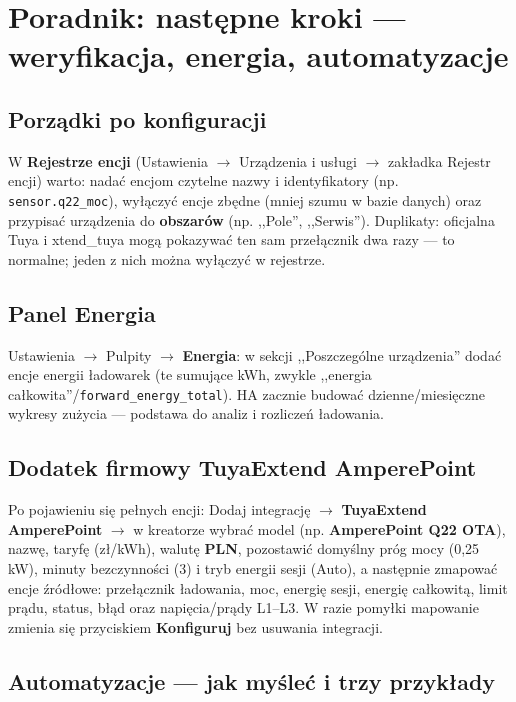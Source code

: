 \documentclass[11pt,a4paper]{article}
\begin{document}
\section{Poradnik: następne kroki --- weryfikacja, energia, automatyzacje}
\label{sec:poradnik}

\subsection{Porządki po konfiguracji}

W \textbf{Rejestrze encji} (Ustawienia $\to$ Urządzenia i usługi $\to$ zakładka Rejestr encji) warto: nadać encjom czytelne nazwy i identyfikatory (np. \texttt{sensor.q22\_moc}), wyłączyć encje zbędne (mniej szumu w bazie danych) oraz przypisać urządzenia do \textbf{obszarów} (np. ,,Pole'', ,,Serwis''). Duplikaty: oficjalna Tuya i xtend\_tuya mogą pokazywać ten sam przełącznik dwa razy --- to normalne; jeden z nich można wyłączyć w rejestrze.

\subsection{Panel Energia}

Ustawienia $\to$ Pulpity $\to$ \textbf{Energia}: w sekcji ,,Poszczególne urządzenia'' dodać encje energii ładowarek (te sumujące kWh, zwykle ,,energia całkowita''/\texttt{forward\_energy\_total}). HA zacznie budować dzienne/miesięczne wykresy zużycia --- podstawa do analiz i rozliczeń ładowania.

\subsection{Dodatek firmowy TuyaExtend AmperePoint}

Po pojawieniu się pełnych encji: Dodaj integrację $\to$ \textbf{TuyaExtend AmperePoint} $\to$ w kreatorze wybrać model (np. \textbf{AmperePoint Q22 OTA}), nazwę, taryfę (zł/kWh), walutę \textbf{PLN}, pozostawić domyślny próg mocy (0{,}25 kW), minuty bezczynności (3) i tryb energii sesji (Auto), a następnie zmapować encje źródłowe: przełącznik ładowania, moc, energię sesji, energię całkowitą, limit prądu, status, błąd oraz napięcia/prądy L1--L3. W razie pomyłki mapowanie zmienia się przyciskiem \textbf{Konfiguruj} bez usuwania integracji.

\subsection{Automatyzacje --- jak myśleć i trzy przykłady}
\end{document}
